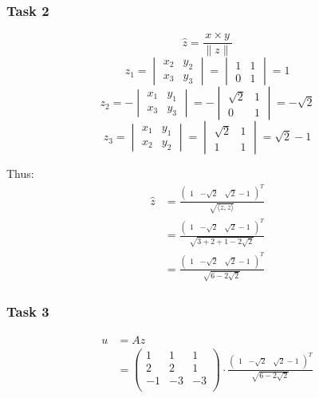 \documentclass[tikz,14pt,fleqn]{article}
\begin{document}
\subsubsection*{Task 2}
\[ \hat{z} = \frac{x \times y}{\|z\|} \]
\[
z_1 =   
\begin{vmatrix}
x_2 & y_2\\
x_3 & y_3
\end{vmatrix} =
\begin{vmatrix}
1 & 1\\
0 & 1
\end{vmatrix} = 1
\]
\[
z_2 = -
\begin{vmatrix}
x_1 & y_1\\
x_3 & y_3
\end{vmatrix} = -
\begin{vmatrix}
\sqrt{2} & 1\\
0 & 1
\end{vmatrix} = -\sqrt{2}
\]
\[
z_3 = 
\begin{vmatrix}
x_1 & y_1 \\
x_2 & y_2
\end{vmatrix} =
\begin{vmatrix}
\sqrt{2} & 1\\
1 & 1
\end{vmatrix} = \sqrt{2} - 1
\]

Thus:
\begin{align*}
\hat{z} &= \frac{\begin{pmatrix}1 & -\sqrt{2} & \sqrt{2}-1\end{pmatrix}^T}{\sqrt{\langle z,z \rangle}} \\
        &= \frac{\begin{pmatrix}1 & -\sqrt{2} & \sqrt{2}-1\end{pmatrix}^T}{\sqrt{3+2+1-2\sqrt{2}}} \\
        &= \frac{\begin{pmatrix}1 & -\sqrt{2} & \sqrt{2}-1\end{pmatrix}^T}{\sqrt{6-2\sqrt{2}}} 
\end{align*}
\subsubsection*{Task 3}
\begin{align*}
    u &= A z \\
    &= \begin{pmatrix}
1 & 1 & 1 \\
2 & 2 & 1 \\
-1 & -3 & -3 \\
\end{pmatrix} \cdot \frac{\begin{pmatrix}1 & -\sqrt{2} & \sqrt{2}-1\end{pmatrix}^T}{\sqrt{6-2\sqrt{2}}} 
\end{align*}
\end{document}
